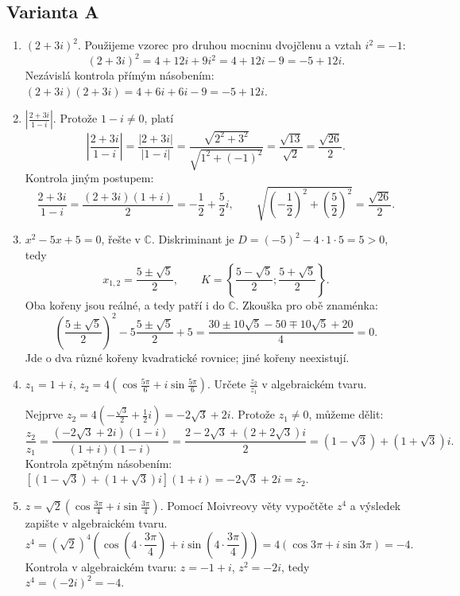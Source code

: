 \documentclass[a4paper,10pt]{article}
\begin{document}
\subsection*{Varianta A}
\begin{enumerate}
\item \((2+3i)^2\).
Použijeme vzorec pro druhou mocninu dvojčlenu a vztah $i^2=-1$:
\[
(2+3i)^2=4+12i+9i^2=4+12i-9=-5+12i.
\]
Nezávislá kontrola přímým násobením:
$(2+3i)(2+3i)=4+6i+6i-9=-5+12i$.

\item \(\left|\frac{2+3i}{1-i}\right|\).
Protože $1-i\neq0$, platí
\[
\left|\frac{2+3i}{1-i}\right|
=\frac{|2+3i|}{|1-i|}
=\frac{\sqrt{2^2+3^2}}{\sqrt{1^2+(-1)^2}}
=\frac{\sqrt{13}}{\sqrt2}=\frac{\sqrt{26}}2.
\]
Kontrola jiným postupem:
\[
\frac{2+3i}{1-i}=\frac{(2+3i)(1+i)}2=-\frac12+\frac52i,
\qquad
\sqrt{\left(-\frac12\right)^2+\left(\frac52\right)^2}=\frac{\sqrt{26}}2.
\]

\item \(x^2-5x+5=0\), řešte v \(\mathbb C\).
Diskriminant je $D=(-5)^2-4\cdot1\cdot5=5>0$, tedy
\[
x_{1,2}=\frac{5\pm\sqrt5}{2},
\qquad
K=\left\{\frac{5-\sqrt5}{2};\frac{5+\sqrt5}{2}\right\}.
\]
Oba kořeny jsou reálné, a tedy patří i do $\mathbb C$.
Zkouška pro obě znaménka:
\[
\left(\frac{5\pm\sqrt5}{2}\right)^2
-5\frac{5\pm\sqrt5}{2}+5
=\frac{30\pm10\sqrt5-50\mp10\sqrt5+20}{4}=0.
\]
Jde o dva různé kořeny kvadratické rovnice; jiné kořeny neexistují.

\item \(z_1=1+i\),
\(z_2=4\left(\cos\frac{5\pi}{6}+i\sin\frac{5\pi}{6}\right)\).
Určete \(\frac{z_2}{z_1}\) v algebraickém tvaru.

Nejprve $z_2=4(-\frac{\sqrt3}{2}+\frac12i)=-2\sqrt3+2i$.
Protože $z_1\neq0$, můžeme dělit:
\[
\frac{z_2}{z_1}
=\frac{(-2\sqrt3+2i)(1-i)}{(1+i)(1-i)}
=\frac{2-2\sqrt3+(2+2\sqrt3)i}{2}
=(1-\sqrt3)+(1+\sqrt3)i.
\]
Kontrola zpětným násobením:
$[(1-\sqrt3)+(1+\sqrt3)i](1+i)=-2\sqrt3+2i=z_2$.

\item \(z=\sqrt2\left(\cos\frac{3\pi}{4}+i\sin\frac{3\pi}{4}\right)\).
Pomocí Moivreovy věty vypočtěte \(z^4\) a výsledek zapište v algebraickém tvaru.
\[
z^4=(\sqrt2)^4\left(\cos\left(4\cdot\frac{3\pi}{4}\right)
+i\sin\left(4\cdot\frac{3\pi}{4}\right)\right)
=4(\cos3\pi+i\sin3\pi)=-4.
\]
Kontrola v algebraickém tvaru: $z=-1+i$, $z^2=-2i$, tedy $z^4=(-2i)^2=-4$.
\end{enumerate}

\newpage
\end{document}
